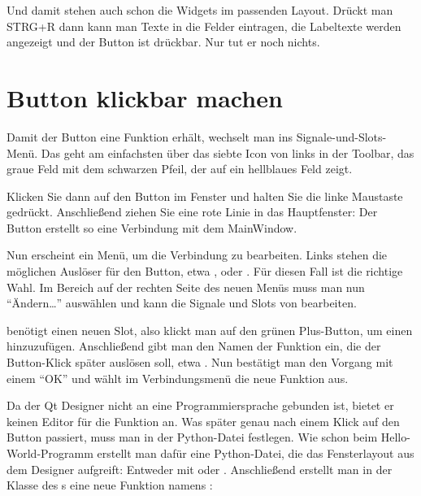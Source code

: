 Und damit stehen auch schon die Widgets im passenden Layout. Drückt man STRG+R dann kann man Texte in die Felder eintragen, die Labeltexte werden angezeigt und der Button ist drückbar. Nur tut er noch nichts.


\section{Button klickbar machen}

Damit der Button eine Funktion erhält, wechselt man ins Signale-und-Slots-Menü. Das geht am einfachsten über das siebte Icon von links in der Toolbar, das graue Feld mit dem schwarzen Pfeil, der auf ein hellblaues Feld zeigt.

Klicken Sie dann auf den Button im Fenster und halten Sie die linke Maustaste gedrückt. Anschließend ziehen Sie eine rote Linie in das Hauptfenster: Der Button erstellt so eine Verbindung mit dem MainWindow.

Nun erscheint ein Menü, um die Verbindung zu bearbeiten. Links stehen die möglichen Auslöser für den Button, etwa ,  oder . Für diesen Fall ist  die richtige Wahl. Im Bereich  auf der rechten Seite des neuen Menüs muss man nun ``Ändern\ldots'' auswählen und kann die Signale und Slots von  bearbeiten.

 benötigt einen neuen Slot, also klickt man auf den grünen Plus-Button, um einen hinzuzufügen. Anschließend gibt man den Namen der Funktion ein, die der Button-Klick später auslösen soll, etwa . Nun bestätigt man den Vorgang mit einem ``OK'' und wählt im Verbindungsmenü die neue Funktion aus.

Da der Qt Designer nicht an eine Programmiersprache gebunden ist, bietet er keinen Editor für die Funktion an. Was später genau nach einem Klick auf den Button passiert, muss man in der Python-Datei festlegen. Wie schon beim Hello-World-Programm erstellt man dafür eine Python-Datei, die das Fensterlayout aus dem Designer aufgreift: Entweder mit  oder . Anschließend erstellt man in der Klasse des s eine neue Funktion namens :

\medskip




